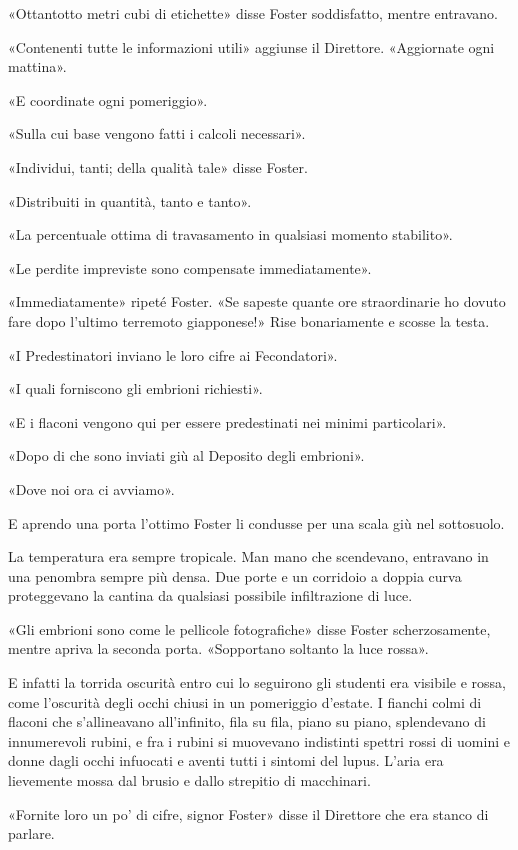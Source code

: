 \documentclass[
a5paper, %
10pt, %
twoside, 
onecolumn, %
openany, %
]{memoir}
\begin{document}
«Ottantotto metri cubi di etichette» disse Foster soddisfatto, mentre entravano.

«Contenenti tutte le informazioni utili» aggiunse il Direttore. «Aggiornate ogni mattina».

«E coordinate ogni pomeriggio».

«Sulla cui base vengono fatti i calcoli necessari».

«Individui, tanti; della qualità tale» disse Foster.

«Distribuiti in quantità, tanto e tanto».

«La percentuale ottima di travasamento in qualsiasi momento stabilito».

«Le perdite impreviste sono compensate immediatamente».

«Immediatamente» ripeté Foster. «Se sapeste quante ore straordinarie ho dovuto fare dopo l’ultimo terremoto giapponese!» Rise bonariamente e scosse la testa.

«I Predestinatori inviano le loro cifre ai Fecondatori».

«I quali forniscono gli embrioni richiesti».

«E i flaconi vengono qui per essere predestinati nei minimi particolari».

«Dopo di che sono inviati giù al Deposito degli embrioni».

«Dove noi ora ci avviamo».

E aprendo una porta l’ottimo Foster li condusse per una scala giù nel sottosuolo.

La temperatura era sempre tropicale. Man mano che scendevano, entravano in una penombra sempre più densa. Due porte e un corridoio a doppia curva proteggevano la cantina da qualsiasi possibile infiltrazione di luce.

«Gli embrioni sono come le pellicole fotografiche» disse Foster scherzosamente, mentre apriva la seconda porta. «Sopportano soltanto la luce rossa».

E infatti la torrida oscurità entro cui lo seguirono gli studenti era visibile e rossa, come l’oscurità degli occhi chiusi in un pomeriggio d’estate. I fianchi colmi di flaconi che s’allineavano all’infinito, fila su fila, piano su piano, splendevano di innumerevoli rubini, e fra i rubini si muovevano indistinti spettri rossi di uomini e donne dagli occhi infuocati e aventi tutti i sintomi del lupus. L’aria era lievemente mossa dal brusio e dallo strepitio di macchinari.

«Fornite loro un po’ di cifre, signor Foster» disse il Direttore che era stanco di parlare.
\end{document}
